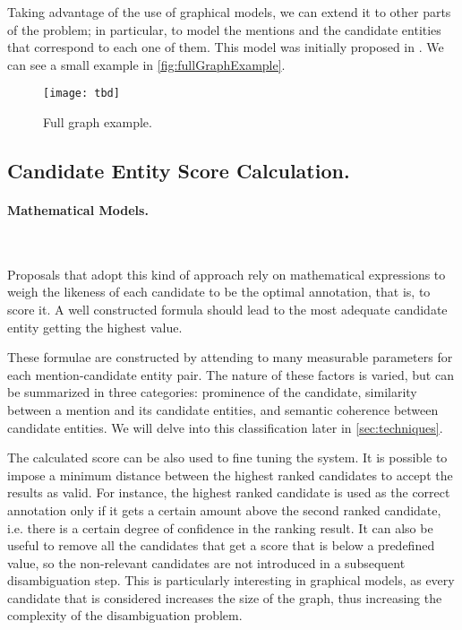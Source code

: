 Taking advantage of the use of graphical models, we can extend it to other parts of the problem; in particular, to model the mentions and the candidate entities that correspond to each one of them. This model was initially proposed in \cite{yosef2011}. We can see a small example in \autoref{fig:fullGraphExample}.

\begin{figure}[!ht]
	\centering
	
	\texttt{[image: tbd]}
	\caption{Full graph example.}
	\label{fig:fullGraphExample}
\end{figure}

\subsection{Candidate Entity Score Calculation.}
\label{sec:scoreCalculation}

\paragraph{Mathematical Models.}~

Proposals that adopt this kind of approach rely on mathematical expressions to weigh the likeness of each candidate to be the optimal annotation, that is, to score it. A well constructed formula should lead to the most adequate candidate entity getting the highest value.

These formulae are constructed by attending to many measurable parameters for each mention-candidate entity pair. The nature of these factors is varied, but can be summarized in three categories: prominence of the candidate, similarity between a mention and its candidate entities, and semantic coherence between candidate entities. We will delve into this classification later in \autoref{sec:techniques}.

The calculated score can be also used to fine tuning the system. It is possible to impose a minimum distance between the highest ranked candidates to accept the results as valid. For instance, the highest ranked candidate is used as the correct annotation only if it gets a certain amount above the second ranked candidate, i.e. there is a certain degree of confidence in the ranking result. It can also be useful to remove all the candidates that get a score that is below a predefined value, so the non-relevant candidates are not introduced in a subsequent disambiguation step. This is particularly interesting in graphical models, as every candidate that is considered increases the size of the graph, thus increasing the complexity of the disambiguation problem.

